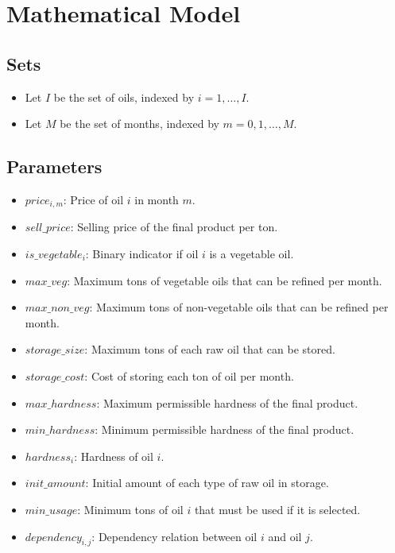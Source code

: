 \documentclass{article}
\begin{document}
\section*{Mathematical Model}

\subsection*{Sets}
\begin{itemize}
    \item Let \( I \) be the set of oils, indexed by \( i = 1, \ldots, I \).
    \item Let \( M \) be the set of months, indexed by \( m = 0, 1, \ldots, M \).
\end{itemize}

\subsection*{Parameters}
\begin{itemize}
    \item \( price_{i,m} \): Price of oil \( i \) in month \( m \).
    \item \( sell\_price \): Selling price of the final product per ton.
    \item \( is\_vegetable_i \): Binary indicator if oil \( i \) is a vegetable oil.
    \item \( max\_veg \): Maximum tons of vegetable oils that can be refined per month.
    \item \( max\_non\_veg \): Maximum tons of non-vegetable oils that can be refined per month.
    \item \( storage\_size \): Maximum tons of each raw oil that can be stored.
    \item \( storage\_cost \): Cost of storing each ton of oil per month.
    \item \( max\_hardness \): Maximum permissible hardness of the final product.
    \item \( min\_hardness \): Minimum permissible hardness of the final product.
    \item \( hardness_i \): Hardness of oil \( i \).
    \item \( init\_amount \): Initial amount of each type of raw oil in storage.
    \item \( min\_usage \): Minimum tons of oil \( i \) that must be used if it is selected.
    \item \( dependency_{i,j} \): Dependency relation between oil \( i \) and oil \( j \).
\end{itemize}
\end{document}

